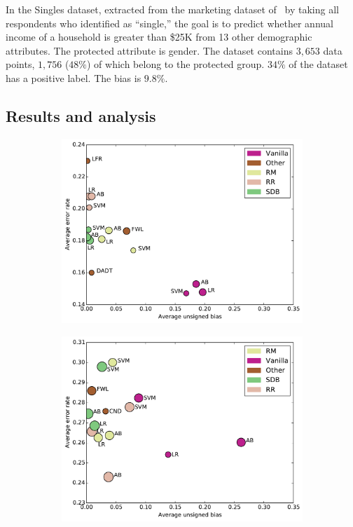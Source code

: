\documentclass[twoside,leqno,twocolumn]{article}
\begin{document}
In the Singles dataset, extracted from the marketing dataset
of~\cite{HastieTF09} by taking all respondents who identified as ``single,''
the goal is to predict whether annual income of a household is greater than
\$25K from 13 other demographic attributes.  The protected attribute is gender.
The dataset contains $3,653$ data points, $1,756$ ($48\%$) of which belong to
the protected group. $34\%$ of the dataset has a positive label. The bias is
$9.8\%$.

\subsection{Results and analysis}\label{sec:results}

\begin{figure}[t]
\centering
\begin{subfigure}{0.65\columnwidth}
\includegraphics[width=\columnwidth]{images/adult_scatter_plot.pdf}
\end{subfigure}
\hspace{1mm}
\begin{subfigure}{0.65\columnwidth}
\includegraphics[width=\columnwidth]{images/german_scatter_plot.pdf}

\end{subfigure}
\end{figure}
\end{document}
